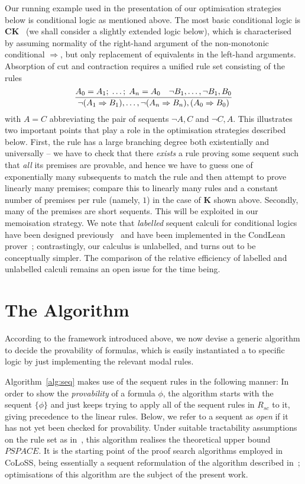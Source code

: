 \documentclass{entcs} \usepackage{entcsmacro}
\begin{document}
Our running example used in the presentation of our optimisation
strategies below is conditional logic as mentioned above. The most
basic conditional logic is $\textbf{CK}$~\cite{Chellas80} (we shall
consider a slightly extended logic below), which is characterised by
assuming normality of the right-hand argument of the non-monotonic
conditional $\Rightarrow$, but only replacement of equivalents in the
left-hand arguments. Absorption of cut and contraction requires a
unified rule set consisting of the rules
\begin{equation*}
  \frac{A_0=A_1;\;\dots;\; A_n=A_0\quad \neg B_1,\dots,\neg B_1,B_0}{\neg(A_1\Rightarrow B_1),\dots,\neg(A_n\Rightarrow B_n),(A_0\Rightarrow B_0)}
\end{equation*}
with $A=C$ abbreviating the pair of sequents $\neg A,C$ and $\neg
C,A$.  This illustrates two important points that play a role in the
optimisation strategies described below. First, the rule has a large
branching degree both existentially and universally -- we have to
check that there \emph{exists} a rule proving some sequent such that
\emph{all} its premises are provable, and hence we have to guess one
of exponentially many subsequents to match the rule and then attempt
to prove linearly many premises; compare this to linearly many rules
and a constant number of premises per rule (namely, $1$) in the case
of $\textbf{K}$ shown above. Secondly, many of the premises are short
sequents. This will be exploited in our memoisation strategy. We note
that \emph{labelled} sequent calculi for conditional logics have been
designed previously~\cite{OlivettiEA07} and have been implemented in
the CondLean prover~\cite{OlivettiPozzato03}; contrastingly, our
calculus is unlabelled, and turns out to be conceptually simpler. The
comparison of the relative efficiency of labelled and unlabelled
calculi remains an open issue for the time being.

\section{The Algorithm}

According to the framework introduced above, we now devise a generic
algorithm to decide the provability of formulas, which is easily
instantiated a to specific logic by just implementing the relevant modal
rules.


Algorithm~\ref{alg:seq} makes use of the sequent rules in the
following manner: In order to show the \emph{provability} of a formula
$\phi$, the algorithm starts with the sequent $\{\phi\}$ and just
keeps trying to apply all of the sequent rules in $R_{sc}$ to it,
giving precedence to the linear rules.  Below, we refer to a sequent
as \emph{open} if it has not yet been checked for provability. Under
suitable tractability assumptions on the rule set as
in~\cite{SchroderPattinson09,PattinsonSchroder08b}, this algorithm
realises the theoretical upper bound $\mathit{PSPACE}$. It is the
starting point of the proof search algorithms employed in CoLoSS,
being essentially a sequent reformulation of the algorithm described
in~\cite{CalinEA09}; optimisations of this algorithm are the subject
of the present work. 
\end{document}
